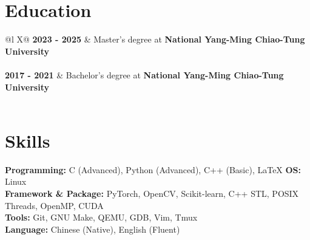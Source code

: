 \documentclass[a4paper,12pt]{article}
\begin{document}
\section{Education}
\begin{tabularx}{\linewidth}{@{}l X@{}}	
\textbf{2023 - 2025} & Master's degree at \textbf{National Yang-Ming Chiao-Tung University} \\%
  \\[3.75pt]

\textbf{2017 - 2021} & Bachelor's degree at \textbf{National Yang-Ming Chiao-Tung University} \\%
  \\ 
\end{tabularx}


\section{Skills}

\fontsize{10pt}{14pt}\selectfont
\noindent \textbf{Programming:} C (Advanced), Python (Advanced), C++ (Basic), \LaTeX \hspace{0.5cm} \textbf{OS:} Linux \\ [0.08cm]
\textbf{Framework \& Package:} PyTorch, OpenCV, Scikit-learn, C++ STL, POSIX Threads, OpenMP, CUDA \\ [0.08cm]
\textbf{Tools:} Git, GNU Make, QEMU, GDB, Vim, Tmux \\ [0.08cm]
\textbf{Language:} Chinese (Native), English (Fluent)

\end{document}
